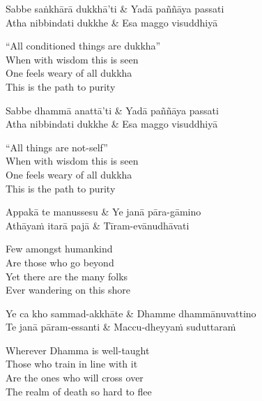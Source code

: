 \begin{twochants}
  Sabbe saṅkhārā dukkhā’ti & Yadā paññāya passati\\
  Atha nibbindati dukkhe & Esa maggo visuddhiyā\\
\end{twochants}

\begin{english}
  “All conditioned things are dukkha”\\
  When with wisdom this is seen\\
  One feels weary of all dukkha\\
  This is the path to purity
\end{english}

\begin{twochants}
  Sabbe dhammā anattā’ti & Yadā paññāya passati\\
  Atha nibbindati dukkhe & Esa maggo visuddhiyā\\
\end{twochants}

\begin{english}
  “All things are not-self”\\
  When with wisdom this is seen\\
  One feels weary of all dukkha\\
  This is the path to purity
\end{english}


\begin{twochants}
  Appakā te manussesu & Ye janā pāra-gāmino\\
  Athāyaṁ itarā pajā & Tīram-evānudhāvati\\
\end{twochants}

\begin{english}
  Few amongst humankind\\
  Are those who go beyond\\
  Yet there are the many folks\\
  Ever wandering on this shore
\end{english}

\begin{twochants}
  Ye ca kho sammad-akkhāte & Dhamme dhammānuvattino\\
  Te janā pāram-essanti & Maccu-dheyyaṁ suduttaraṁ\\
\end{twochants}

\begin{english}
  Wherever Dhamma is well-taught\\
  Those who train in line with it\\
  Are the ones who will cross over\\
  The realm of death so hard to flee
\end{english}

